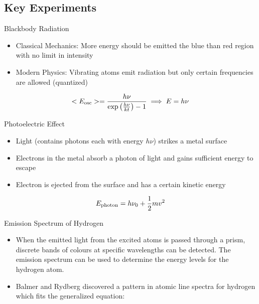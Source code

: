 \documentclass[11pt,fleqn]{book} %
\begin{document}
\subsection*{Key Experiments}
\begin{descriptions}
    \item[Blackbody Radiation]
    \begin{descriptions}
    \end{descriptions}
    \begin{itemize}
        \item Classical Mechanics: More energy should be emitted the blue than red region with no limit in intensity
        \item Modern Physics: Vibrating atoms emit radiation but only certain frequencies are allowed (quantized)
    \end{itemize}
    \begin{proposition}
        $$<E_{\rm osc}>=\frac{h\nu}{\exp{\left(\frac{h\nu}{kt}\right)}-1}\implies E=h\nu$$
    \end{proposition}
    \item[Photoelectric Effect] 
    \begin{descriptions}
    \end{descriptions}
    \begin{itemize}
        \item Light (contains photons each with energy $h\nu$) strikes a metal surface
        \item Electrons in the metal absorb a photon of light and gains sufficient energy to escape
        \item Electron is ejected from the surface and has a certain kinetic energy
    \end{itemize}
    \begin{proposition}
        $$E_{\rm photon}=h\nu_0+\frac{1}{2}mv^2$$
    \end{proposition}
    \item[Emission Spectrum of Hydrogen] 
    \begin{descriptions}
    \end{descriptions}
    \begin{itemize}
        \item When the emitted light from the excited atoms is passed through a prism, discrete bands of colours at specific wavelengths can be detected. The emission spectrum can be used to determine the energy levels for the hydrogen atom. 
        \item Balmer and Rydberg discovered a pattern in atomic line spectra for hydrogen which fits the generalized equation: 

\end{itemize}
\end{descriptions}
\end{document}
